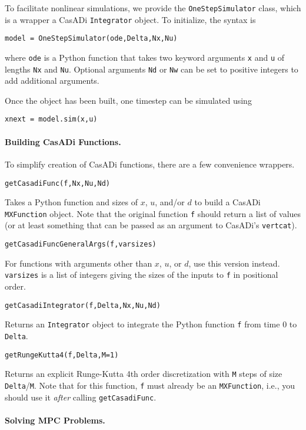 \documentclass{article}
\newcommand{\funcname}[2][.25em]{\vspace{#1}\noindent\texttt{#2}\nopagebreak\vspace{#1}}
\newcommand{\casadi}{CasADi}
\begin{document}
\begin{multicols}{2}
To facilitate nonlinear simulations, we provide the \texttt{OneStepSimulator} class, which is a wrapper a \casadi{} \texttt{Integrator} object.
To initialize, the syntax is
%
\begin{lstlisting}[frame=L]
model = OneStepSimulator(ode,Delta,Nx,Nu)
\end{lstlisting}
%
where \texttt{ode} is a Python function that takes two keyword arguments \texttt{x} and \texttt{u} of lengths \texttt{Nx} and \texttt{Nu}.
Optional arguments \texttt{Nd} or \texttt{Nw} can be set to positive integers to add additional arguments.

Once the object has been built, one timestep can be simulated using
\begin{lstlisting}[frame=L]
xnext = model.sim(x,u)
\end{lstlisting}

\paragraph*{Building \casadi{} Functions.}

To simplify creation of \casadi{} functions, there are a few convenience wrappers.

\funcname{getCasadiFunc(f,Nx,Nu,Nd)}

Takes a Python function and sizes of $x$, $u$, and/or $d$ to build a \casadi{} \texttt{MXFunction} object.
Note that the original function \texttt{f} should return a list of values (or at least something that can be passed as an argument to \casadi's \texttt{vertcat}).

\funcname{getCasadiFuncGeneralArgs(f,varsizes)}

For functions with arguments other than $x$, $u$, or $d$, use this version instead. \texttt{varsizes} is a list of integers giving the sizes of the inputs to \texttt{f} in positional order.

\funcname{getCasadiIntegrator(f,Delta,Nx,Nu,Nd)}

Returns an \texttt{Integrator} object to integrate the Python function \texttt{f} from time 0 to \texttt{Delta}.

\funcname{getRungeKutta4(f,Delta,M=1)}

Returns an explicit Runge-Kutta 4th order discretization with \texttt{M} steps of size \texttt{Delta}/\texttt{M}.
Note that for this function, \texttt{f} must already be an \texttt{MXFunction}, i.e., you should use it \emph{after} calling \texttt{getCasadiFunc}.

\paragraph*{Solving MPC Problems.}


\end{multicols}
\end{document}

